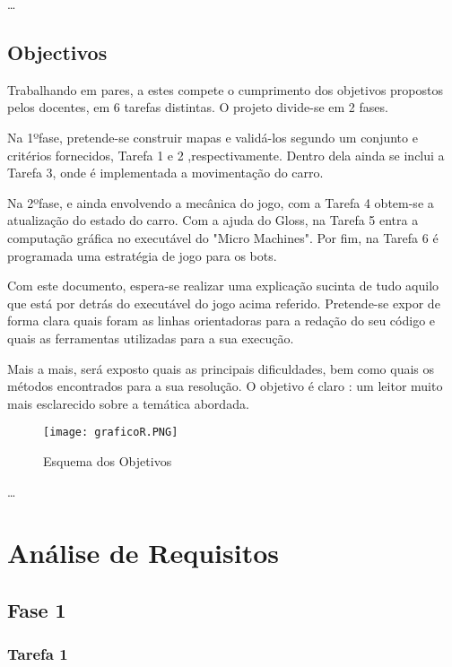 \documentclass[a4paper]{report} %
\begin{document}
 \newpage
  
 
 \ldots
 \section{Objectivos}
    
    Trabalhando em pares, a estes compete o cumprimento dos objetivos propostos pelos docentes, em 6 tarefas distintas.
    O projeto divide-se em 2 fases. 
    
    Na 1ºfase, pretende-se construir mapas e validá-los segundo um conjunto e critérios fornecidos, Tarefa 1 e 2 ,respectivamente. Dentro dela ainda se inclui a Tarefa 3, onde é implementada a movimentação do carro. 
    
    Na 2ºfase, e ainda envolvendo a mecânica do jogo, com a Tarefa 4 obtem-se a atualização do estado do carro. Com a ajuda do Gloss, na Tarefa 5 entra a computação gráfica no executável do "Micro Machines". Por fim, na Tarefa 6 é programada uma estratégia de jogo para os bots.
    
    Com este documento, espera-se realizar uma explicação sucinta de tudo aquilo que está por detrás do executável do jogo acima referido. Pretende-se expor de forma clara quais foram as linhas orientadoras para a redação do seu código e quais as ferramentas utilizadas para a sua execução.
    
    Mais a mais, será exposto quais as principais dificuldades, bem como quais os métodos encontrados para a sua resolução.
    O objetivo é claro : um leitor muito mais esclarecido sobre a temática abordada.
    
    
   \begin{figure}[h!]
        \centering
        \texttt{[image: graficoR.PNG]}
        \caption{Esquema dos Objetivos}
        \label{fig:my_label}
    \end{figure}

    \ldots

\chapter{Análise de Requisitos}

\section{Fase 1}
\label{sec:analisefase1}

\subsection{Tarefa 1}
\end{document}
